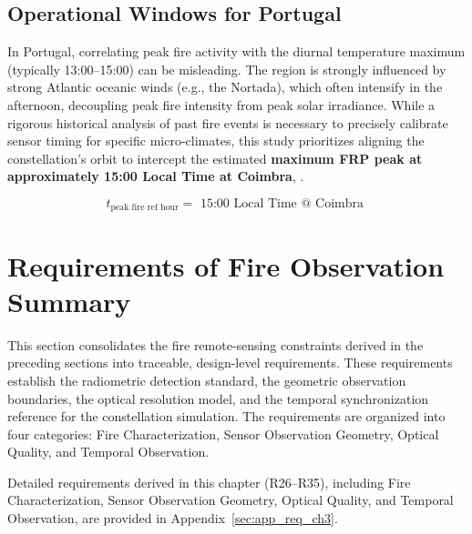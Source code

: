 \subsection{Operational Windows for Portugal}
In Portugal, correlating peak fire activity with the diurnal temperature maximum (typically 13:00--15:00) can be misleading. The region is strongly influenced by strong Atlantic oceanic winds (e.g., the Nortada), which often intensify in the afternoon, decoupling peak fire intensity from peak solar irradiance. While a rigorous historical analysis of past fire events is necessary to precisely calibrate sensor timing for specific micro-climates, this study prioritizes aligning the constellation's orbit to intercept the estimated \textbf{maximum FRP peak at approximately 15:00 Local Time at Coimbra}, . 

\begin{equation}
    t_{\text{peak fire ref hour}} = \text{ 15:00 Local Time @ Coimbra }
    \label{eq:peak_fire_ref_hour}
\end{equation}


\section{Requirements of Fire Observation
Summary}\label{33---requirements-of-fire-observation-summary}

This section consolidates the fire remote-sensing constraints derived in the preceding sections into traceable, design-level requirements. These requirements establish the radiometric detection standard, the geometric observation boundaries, the optical resolution model, and the temporal synchronization reference for the constellation simulation. The requirements are organized into four categories: Fire Characterization, Sensor Observation Geometry, Optical Quality, and Temporal Observation.


Detailed requirements derived in this chapter (R26--R35), including Fire Characterization, Sensor Observation Geometry, Optical Quality, and Temporal Observation, are provided in Appendix~\ref{sec:app_req_ch3}.